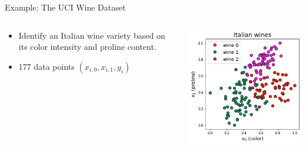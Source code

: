 \begin{frame}{Example: The UCI Wine Dataset}

    \begin{columns}
        \begin{column}{0.51\linewidth}
    \begin{itemize}
        \setlength\itemsep{1em}
        \item Identify an Italian wine variety based on its color intensity and proline content.
        \item 177 data points $(x_{i,0}, x_{i,1}, y_i)$
    \end{itemize}
        \end{column}
        \begin{column}{0.5\linewidth}
            \includegraphics[scale=0.45]{wines.jpg}
        \end{column}
    \end{columns}

\end{frame}

